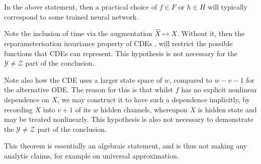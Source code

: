 \documentclass{article}
\theoremstyle{plain}
\theoremstyle{definition}
\begin{document}
	In the above statement, then a practical choice of $f \in F$ or $h \in H$ will typically correspond to some trained neural network.
	
	Note the inclusion of time via the augmentation $\widehat{X} \mapsto X$. Without it, then the reparameterisation invariance property of CDEs \cite{hambly2010uniqueness}, \cite[Proposition A.7]{kidger2019deep} will restrict the possible functions that CDEs can represent. This hypothesis is not necessary for the $\mathcal{Y} \neq \mathcal{Z}$ part of the conclusion.
	
	Note also how the CDE uses a larger state space of $w$, compared to $w - v - 1$ for the alternative ODE. The reason for this is that whilst $f$ has no explicit nonlinear dependence on $X$, we may construct it to have such a dependence implicitly, by recording $X$ into $v + 1$ of its $w$ hidden channels, whereupon $X$ is hidden state and may be treated nonlinearly. This hypothesis is also not necessary to demonstrate the $\mathcal{Y} \neq \mathcal{Z}$ part of the conclusion.
	
	This theorem is essentially an algebraic statement, and is thus not making any analytic claims, for example on universal approximation.
	
\end{document}
